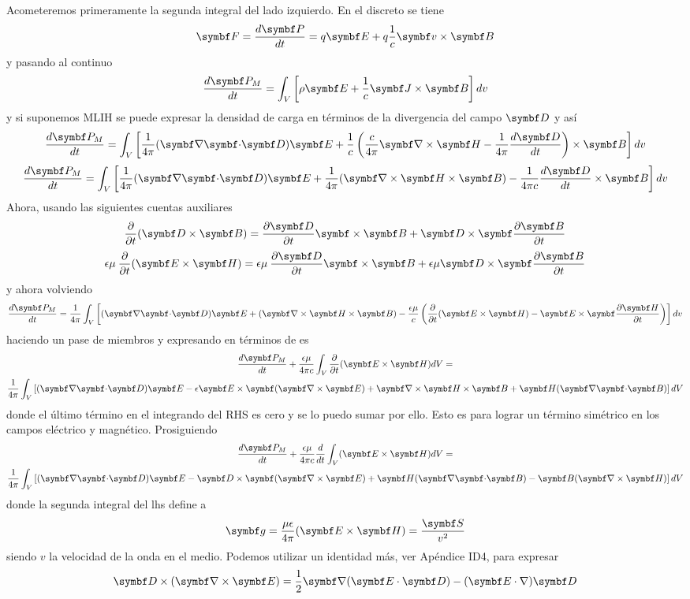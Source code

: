 \documentclass[10pt,oneside]{CBFT_book}
\begin{document}
Acometeremos primeramente la segunda integral del lado izquierdo.
En el discreto se tiene
\[
	\vb{F} = \dtot{\vb{P}}{t} = q\vb{E} + q\frac{1}{c} \pv{v}{B} 
\]
y pasando al continuo
\[
	\dtot{\vb{P}_M}{t} = \int_V \left[ \rho\vb{E} + \frac{1}{c} \pv{J}{B}  \right] dv
\]
y si suponemos MLIH se puede expresar la densidad de carga en términos de la divergencia
del campo $\vb{D}$ y así
\[
	\dtot{\vb{P}_M}{t} = \int_V \left[ \frac{1}{4\pi} (\divem{D}) \vb{E} + 
	\frac{1}{c} \left( \frac{c}{4\pi}\rotorm{H} - \frac{1}{4\pi}\dtot{\vb{D}}{t} \right) 
	\times \vb{B} \right] dv
\]
\[
	\dtot{\vb{P}_M}{t} = \int_V \left[ \frac{1}{4\pi} (\divem{D}) \vb{E} +  
	\frac{1}{4\pi} (\Nabla\times\vb{H}\times\vb{B}) - \frac{1}{4\pi c}\dtot{\vb{D}}{t} 
	\times \vb{B} \right] dv
\]
Ahora, usando las siguientes cuentas auxiliares
\[
	\dpar{}{t}(\pv{D}{B}) = \dpar{\vb{D}}{t}\pv{}{B} + \pv{D}{}\dpar{\vb{B}}{t}
\]
\[
	\epsilon\mu \: \dpar{}{t}(\pv{E}{H}) = \epsilon\mu \: \dpar{\vb{D}}{t}\pv{}{B} + 
	\epsilon\mu\pv{D}{}\dpar{\vb{B}}{t}
\]
y ahora volviendo
\[
	\dtot{\vb{P}_M}{t} = \frac{1}{4\pi} \int_V \left[  (\divem{D}) \vb{E} + (\Nabla\times\vb{H}\times\vb{B}) 
	-\frac{\epsilon\mu}{c} \left( \dpar{}{t}(\pv{E}{H}) - \pv{E}{}\dpar{\vb{H}}{t} \right) \right] dv	
\]
haciendo un pase de miembros y expresando  en términos de  es
\begin{multline*}
	\dtot{\vb{P}_M}{t} + \frac{\epsilon\mu }{4\pi c} \int_V \dpar{}{t}(\pv{E}{H}) dV = \\
	\frac{1}{4\pi} \int_V \left[  (\divem{D}) \vb{E} - \epsilon \pv{E}{}(\Nabla\times\vb{E}) +
	\rotorm{H}\times\vb{B} + \vb{H}(\divem{B}) \right] dV	 
\end{multline*}
donde el último término en el integrando del RHS es cero y se lo puedo sumar por ello.
Esto es para lograr un término simétrico en los campos eléctrico y magnético.
Prosiguiendo
\begin{multline*}
	\dtot{\vb{P}_M}{t} + \frac{\epsilon\mu }{4\pi c} \dtot{}{t}\int_V (\pv{E}{H}) dV = \\
	\frac{1}{4\pi} \int_V \left[  (\divem{D}) \vb{E} - \pv{D}{}(\Nabla\times\vb{E}) +
	\vb{H}(\divem{B}) - \vb{B}(\rotorm{H}) \right] dV	
\end{multline*}
donde la segunda integral del lhs define a
\[
	\vb{g} = \frac{\mu \epsilon}{4\pi} (\pv{E}{H}) = \frac{\vb{S}}{v^2}
\]
siendo $v$ la velocidad de la onda en el medio.
Podemos utilizar un identidad más, ver Apéndice ID4, para expresar
\[
	\vb{D}\times(\rotorm{E}) = \frac{1}{2} \Nabla(\pe{E}{D}) - (\vb{E}\cdot\nabla)\vb{D}
\]
\end{document}
